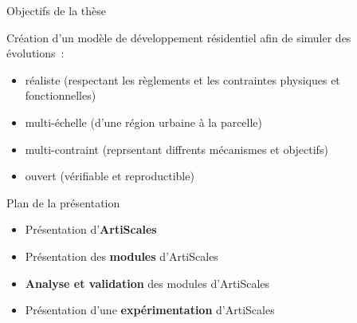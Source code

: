 \documentclass[xcolor=table]{beamer}
\begin{document}
\begin{frame}{Objectifs de la thèse}
	\begin{block}{}
		Création d'un modèle de développement résidentiel afin de simuler des évolutions~:
		\begin{itemize}
			\footnotesize
			\item réaliste (respectant les règlements et les contraintes physiques et fonctionnelles)
			\item multi-échelle (d'une région urbaine à la parcelle)
			\item multi-contraint (reprsentant diffrents mécanismes et objectifs)
			\item ouvert (vérifiable et reproductible) %
		\end{itemize}
	\end{block}
	\vspace{-0.42cm}
\end{frame}








\begin{frame}{Plan de la présentation}
	\begin{itemize}
		\item Présentation d'\textbf{ArtiScales}
		\item Présentation des \textbf{modules} d'ArtiScales
		\item \textbf{Analyse et validation} des modules d'ArtiScales
		\item Présentation d'une \textbf{expérimentation} d'ArtiScales
	\end{itemize}
\end{frame}
\end{document}
